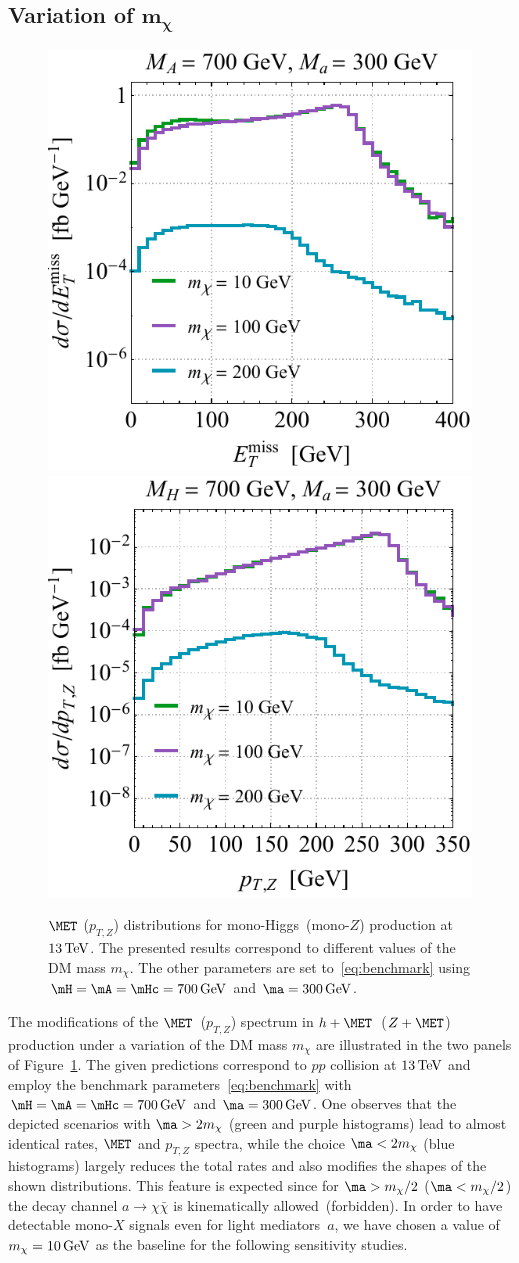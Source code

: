 \subsection*{Variation of $\bm{m_\chi}$}

\begin{figure}[t!]
\centering
\includegraphics[height=0.45\textwidth]{texinputs/04_grid/newfigures/mdml.pdf} \qquad 
\includegraphics[height=0.45\textwidth]{texinputs/04_grid/newfigures/mdmr.pdf}
\vspace{2mm}
\caption{\label{fig:mdmvar} $\MET$ ($p_{T,Z}$) distributions for mono-Higgs~(mono-$Z$) production at $13 \, {\rm TeV}$. The presented results correspond to different values of the DM mass $m_\chi$. The other \hdma parameters are set to~\eqref{eq:benchmark} using $\mH = \mA = \mHc = 700 \, {\rm GeV}$ and $\ma = 300 \, {\rm GeV}$. }
\end{figure}

The modifications of the $\MET$~($p_{T,Z}$) spectrum in $h+\MET$~($Z+\MET$) production under a variation of the DM mass $m_\chi$ are illustrated in the two panels of Figure~\ref{fig:mdmvar}. The given predictions correspond to $pp$ collision at $13 \, {\rm TeV}$ and employ the benchmark parameters~\eqref{eq:benchmark} with $\mH = \mA = \mHc = 700 \, {\rm GeV}$ and $\ma = 300 \, {\rm GeV}$. One observes that the depicted scenarios with $\ma  > 2 m_\chi$ (green and purple histograms) lead to almost identical rates, $\MET$ and $p_{T,Z}$ spectra, while the choice $\ma  < 2 m_\chi$ (blue histograms) 
largely reduces the total rates and also modifies the shapes of the shown distributions. This feature is expected since for $\ma > m_\chi/2$ ($\ma < m_\chi/2$) the decay channel $a \to \chi \bar \chi$ is kinematically allowed~(forbidden). In order to have detectable mono-$X$ signals even for light mediators~$a$, we have chosen a value of  $m_\chi = 10 \, {\rm GeV}$ as the baseline for the following sensitivity studies. %

